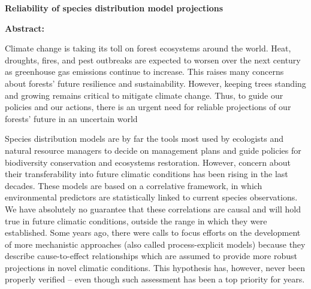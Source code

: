 \newpage
\null\vfill

\thispagestyle{empty}


{\fontsize{8.5}{9}\selectfont
\begin{center}


\textbf{\sffamily Reliability of species distribution model projections} \\
\end{center} 
\textbf{Abstract:}

Climate change is taking its toll on forest ecosystems around the world. Heat, droughts, fires, and pest outbreaks are expected to worsen over the next century as greenhouse gas emissions continue to increase. This raises many concerns about forests' future resilience and sustainability. However, keeping trees standing and growing remains critical to mitigate climate change. Thus, to guide our policies and our actions, there is an urgent need for reliable projections of our forests' future in an uncertain world

Species distribution models are by far the tools most used by ecologists and natural resource managers to decide on management plans and guide policies for biodiversity conservation and ecosystems restoration. However, concern about their transferability into future climatic conditions has been rising in the last decades. These models are based on a correlative framework, in which environmental predictors are statistically linked to current species observations. We have absolutely no guarantee that these correlations are causal and will hold true in future climatic conditions, outside the range in which they were established. Some years ago, there were calls to focus efforts on the development of more mechanistic approaches (also called process-explicit models) because they describe cause-to-effect relationships which are assumed to provide more robust projections in novel climatic conditions. This hypothesis has, however, never been properly verified – even though such assessment has been a top priority for years.

}
